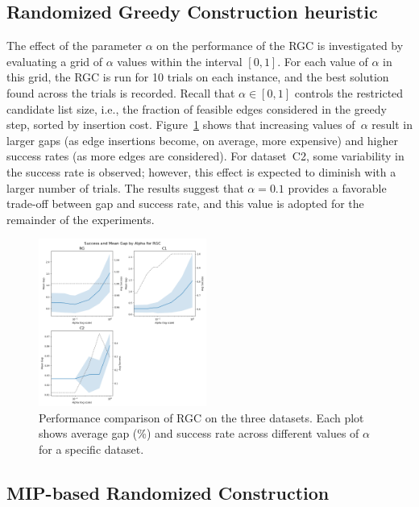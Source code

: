 \documentclass[twocolumn]{article} %
\begin{document}
\subsection{Randomized Greedy Construction heuristic}
The effect of the parameter $\alpha$ on the performance of the RGC is investigated by evaluating a grid of $\alpha$ values within the interval $[0, 1]$. 
For each value of $\alpha$ in this grid, the RGC is run for 10 trials on each instance, and the best solution found across the trials is recorded. 
Recall that $\alpha \in [0, 1]$ controls the restricted candidate list size, i.e., the fraction of feasible edges considered in the greedy step, sorted by insertion cost.
Figure~\ref{fig:alpha_vs_mean_gap_randomized_greedy} shows that increasing values of~$\alpha$ result in larger gaps (as edge insertions become, on average, more expensive) and higher success rates (as more edges are considered). For dataset~C2, some variability in the success rate is observed; however, this effect is expected to diminish with a larger number of trials. The results suggest that $\alpha = 0.1$ provides a favorable trade-off between gap and success rate, and this value is adopted for the remainder of the experiments.

\begin{figure}[h]
    \centering
    \includegraphics[width=0.49\textwidth]{figures/alpha_vs_mean_gap_randomized_greedy.png}
    \caption{Performance comparison of RGC on the three datasets. Each plot shows average gap (\%) and success rate across different values of $\alpha$ for a specific dataset.}
    \label{fig:alpha_vs_mean_gap_randomized_greedy}
\end{figure}


\subsection{MIP-based Randomized Construction}
\end{document}
